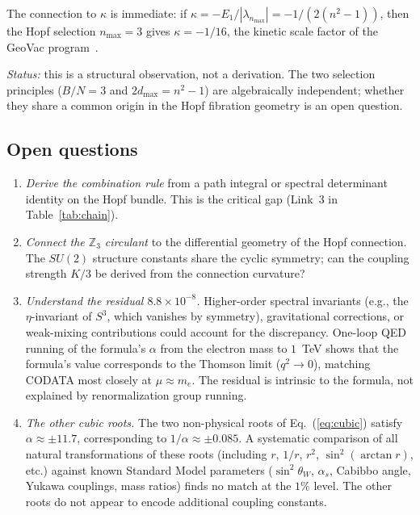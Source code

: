 \documentclass[aps,prl,twocolumn,superscriptaddress]{revtex4-2}
\begin{document}
The connection to $\kappa$ is immediate: if
$\kappa = -E_1/|\lambda_{n_{\max}}| = -1/(2(n^2-1))$, then the Hopf
selection $n_{\max} = 3$ gives $\kappa = -1/16$, the kinetic scale
factor of the GeoVac program~\cite{paper7}.

\textit{Status:} this is a structural observation, not a derivation. The
two selection principles ($B/N = 3$ and $2d_{\max} = n^2 - 1$) are
algebraically independent; whether they share a common origin in the
Hopf fibration geometry is an open question.


\subsection{Open questions}

\begin{enumerate}
\item \textit{Derive the combination rule} from a path integral or
  spectral determinant identity on the Hopf bundle. This is the
  critical gap (Link~3 in Table~\ref{tab:chain}).

\item \textit{Connect the $\mathbb{Z}_3$ circulant} to the
  differential geometry of the Hopf connection. The $SU(2)$ structure
  constants share the cyclic symmetry; can the coupling strength
  $K/3$ be derived from the connection curvature?

\item \textit{Understand the residual $8.8 \times 10^{-8}$.} Higher-order
  spectral invariants (e.g., the $\eta$-invariant of $S^3$, which
  vanishes by symmetry), gravitational corrections, or weak-mixing
  contributions could account for the discrepancy. One-loop QED
  running of the formula's $\alpha$ from the electron mass to $1$~TeV
  shows that the formula's value corresponds to the Thomson limit
  ($q^2 \to 0$), matching CODATA most closely at $\mu \approx m_e$.
  The residual is intrinsic to the formula, not explained by
  renormalization group running.

\item \textit{The other cubic roots.} The two non-physical roots of
  Eq.~(\ref{eq:cubic}) satisfy $\alpha \approx \pm 11.7$,
  corresponding to $1/\alpha \approx \pm 0.085$. A systematic
  comparison of all natural transformations of these roots (including
  $r$, $1/r$, $r^2$, $\sin^2(\arctan r)$, etc.) against known
  Standard Model parameters ($\sin^2\theta_W$, $\alpha_s$, Cabibbo
  angle, Yukawa couplings, mass ratios) finds no match at the $1\%$
  level. The other roots do not appear to encode additional coupling
  constants.


\end{enumerate}
\end{document}
